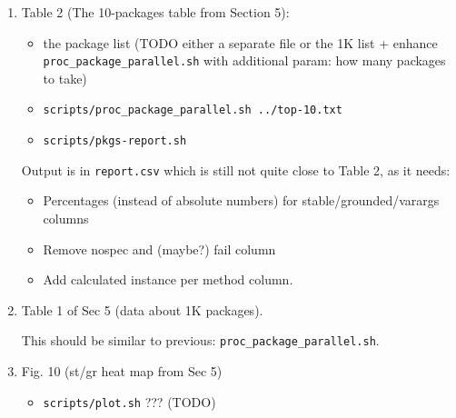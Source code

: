 \documentclass[
]{article}
\providecommand{\tightlist}{%
  \setlength{\itemsep}{0pt}\setlength{\parskip}{0pt}}
\begin{document}
\begin{enumerate}
\def\labelenumi{\arabic{enumi}.}
\item
  Table 2 (The 10-packages table from Section 5):

  \begin{itemize}
  \tightlist
  \item
    the package list (TODO either a separate file or the 1K list +
    enhance \texttt{proc\_package\_parallel.sh} with additional param:
    how many packages to take)
  \item
    \texttt{scripts/proc\_package\_parallel.sh\ ../top-10.txt}
  \item
    \texttt{scripts/pkgs-report.sh}
  \end{itemize}

  Output is in \texttt{report.csv} which is still not quite close to
  Table 2, as it needs:

  \begin{itemize}
  \tightlist
  \item
    Percentages (instead of absolute numbers) for
    stable/grounded/varargs columns
  \item
    Remove nospec and (maybe?) fail column
  \item
    Add calculated instance per method column.
  \end{itemize}
\item
  Table 1 of Sec 5 (data about 1K packages).

  This should be similar to previous:
  \texttt{proc\_package\_parallel.sh}.
\item
  Fig. 10 (st/gr heat map from Sec 5)

  \begin{itemize}
  \tightlist
  \item
    \texttt{scripts/plot.sh} ??? (TODO)
  \end{itemize}
\end{enumerate}
\end{document}
